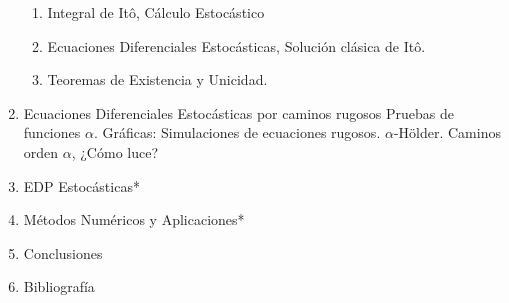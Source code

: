 \documentclass[12pt, twocolumns]{book}
\begin{document}
\begin{enumerate}
\begin{enumerate}
	\item Integral de Itô, Cálculo Estocástico
	\item Ecuaciones Diferenciales Estocásticas, Solución clásica de Itô.
	\item Teoremas de Existencia y Unicidad.

\end{enumerate}



\item Ecuaciones Diferenciales Estocásticas por caminos rugosos
Pruebas de funciones $\alpha$.
Gráficas: Simulaciones de ecuaciones rugosos. $\alpha$-Hölder.
Caminos orden $\alpha$, ¿Cómo luce?



\item EDP Estocásticas*
\item Métodos Numéricos y Aplicaciones*
\item Conclusiones
\item Bibliografía

\end{enumerate}

\newpage





\tableofcontents















\end{document}
